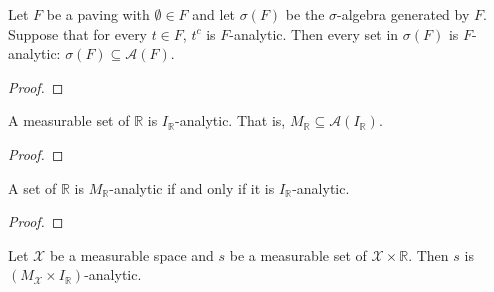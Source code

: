 \begin{lemma}\label{lem:isPavingAnalytic_of_measurableSet_generateFrom}
  \leanok
Let $F$ be a paving with $\emptyset \in F$ and let $\sigma(F)$ be the $\sigma$-algebra generated by $F$.
Suppose that for every $t \in F$, $t^c$ is $F$-analytic.
Then every set in $\sigma(F)$ is $F$-analytic: $\sigma(F) \subseteq \mathcal{A}(F)$.
\end{lemma}

\begin{proof}\leanok

\end{proof}


\begin{lemma}\label{lem:MeasurableSet.isPavingAnalytic_Icc_real}
A measurable set of $\mathbb{R}$ is $I_{\mathbb{R}}$-analytic.
That is, $M_{\mathbb{R}} \subseteq \mathcal{A}(I_{\mathbb{R}})$.
\end{lemma}

\begin{proof}  

\end{proof}


\begin{lemma}\label{lem:IsPavingAnalytic_measurableSet_iff_isPavingAnalytic_Icc}
  \leanok
A set of $\mathbb{R}$ is $M_{\mathbb{R}}$-analytic if and only if it is $I_{\mathbb{R}}$-analytic.
\end{lemma}

\begin{proof}\leanok

\end{proof}


\begin{lemma}\label{lem:MeasurableSet.isPavingAnalytic_image2_prod}
Let $\mathcal{X}$ be a measurable space and $s$ be a measurable set of $\mathcal{X} \times \mathbb{R}$.
Then $s$ is $(M_{\mathcal{X}} \times I_{\mathbb{R}})$-analytic.
\end{lemma}

